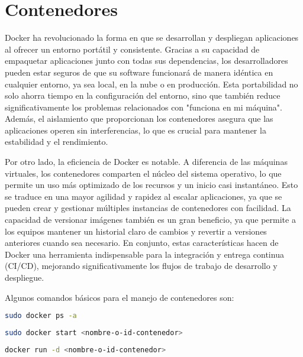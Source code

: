 \section{Contenedores}

Docker ha revolucionado la forma en que se desarrollan y despliegan aplicaciones al ofrecer un entorno portátil y consistente. Gracias a su capacidad de empaquetar aplicaciones junto con todas sus dependencias, los desarrolladores pueden estar seguros de que su software funcionará de manera idéntica en cualquier entorno, ya sea local, en la nube o en producción. Esta portabilidad no solo ahorra tiempo en la configuración del entorno, sino que también reduce significativamente los problemas relacionados con "funciona en mi máquina". Además, el aislamiento que proporcionan los contenedores asegura que las aplicaciones operen sin interferencias, lo que es crucial para mantener la estabilidad y el rendimiento.

Por otro lado, la eficiencia de Docker es notable. A diferencia de las máquinas virtuales, los contenedores comparten el núcleo del sistema operativo, lo que permite un uso más optimizado de los recursos y un inicio casi instantáneo. Esto se traduce en una mayor agilidad y rapidez al escalar aplicaciones, ya que se pueden crear y gestionar múltiples instancias de contenedores con facilidad. La capacidad de versionar imágenes también es un gran beneficio, ya que permite a los equipos mantener un historial claro de cambios y revertir a versiones anteriores cuando sea necesario. En conjunto, estas características hacen de Docker una herramienta indispensable para la integración y entrega continua (CI/CD), mejorando significativamente los flujos de trabajo de desarrollo y despliegue.

Algunos comandos básicos para el manejo de contenedores son:

\begin{lstlisting}[language=bash, caption={Lista todos los contenedores en un sistema}, label=lst:docker_ps_a]
    sudo docker ps -a
\end{lstlisting}

\begin{lstlisting}[language=bash, caption={Inicializa el contenedor mediante el ID}, label=lst:docker_start]
    sudo docker start <nombre-o-id-contenedor>
\end{lstlisting}

\begin{lstlisting}[language=bash, caption={Ejecuta el contenedor en segundo plano}, label=lst:docker_init]
    docker run -d <nombre-o-id-contenedor>
\end{lstlisting}

